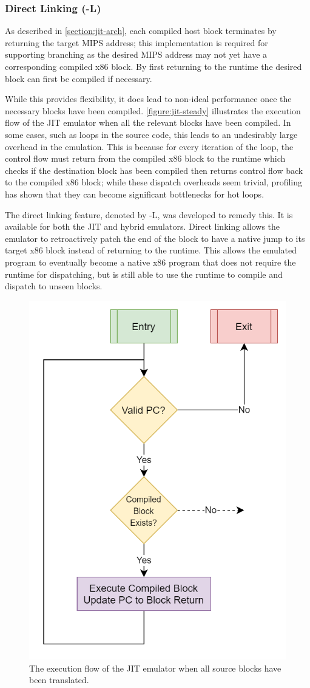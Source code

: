 \subsubsection{Direct Linking (-L)}

As described in \autoref{section:jit-arch}, each compiled host block terminates by returning the target MIPS address; this implementation is required for supporting branching as the desired MIPS address may not yet have a corresponding compiled x86 block. By first returning to the runtime the desired block can first be compiled if necessary.

While this provides flexibility, it does lead to non-ideal performance once the necessary blocks have been compiled. \autoref{figure:jit-steady} illustrates the execution flow of the JIT emulator when all the relevant blocks have been compiled. In some cases, such as loops in the source code, this leads to an undesirably large overhead in the emulation. This is because for every iteration of the loop, the control flow must return from the compiled x86 block to the runtime which checks if the destination block has been compiled then returns control flow back to the compiled x86 block; while these dispatch overheads seem trivial, profiling has shown that they can become significant bottlenecks for hot loops.

The direct linking feature, denoted by -L, was developed to remedy this. It is available for both the JIT and hybrid emulators. Direct linking allows the emulator to retroactively patch the end of the block to have a native jump to its target x86 block instead of returning to the runtime. This allows the emulated program to eventually become a native x86 program that does not require the runtime for dispatching, but is still able to use the runtime to compile and dispatch to unseen blocks.

\begin{figure}[h]
    \centering
    \includegraphics[width=0.5\linewidth]{diagrams/jit-steady.png}
    \caption{The execution flow of the JIT emulator when all source blocks have been translated.}
    \label{figure:jit-steady}
\end{figure}


